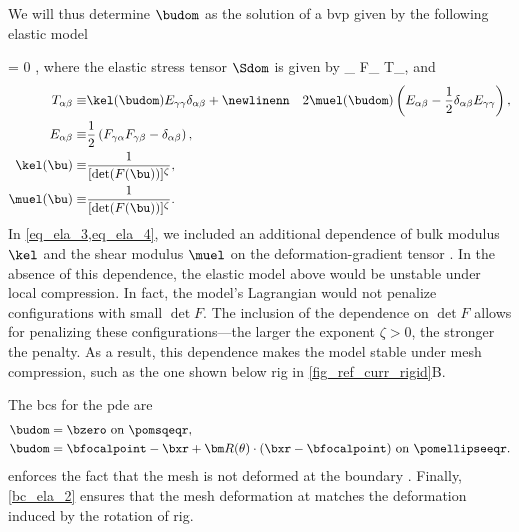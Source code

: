 We will thus determine $\budom$ as the solution of a \ac{bvp} given by the following elastic model \cite{kamenskyLectureNotesMAE,marsdenMathematicalFoundationsElasticity1994}

\be\label{eq_mesh_fluid_rigid}
\pder{\Sdom_{\alpha \beta}(\budom)}{\xr^\beta} = 0  \omr,
\ee
where the elastic stress tensor $\Sdom$ is given by
\be
\label{eq_def_S}
\Sdom_{\alpha \beta} \equiv F_{\alpha \gamma} T_{\gamma \beta},
\ee
and
\begin{align}
        \label{eq_ela_1}
        T_{\alpha \beta}  \equiv & \kel(\budom) E_{\gamma \gamma} \delta_{\alpha \beta} +\newlinenn
                                 & 2 \muel(\budom) \left(E_{\alpha \beta} - \frac{1}{2} \delta_{\alpha \beta} E_{\gamma \gamma}\right), \\
        \label{eq_ela_2}
        E_{\alpha \beta}  \equiv & \frac{1}{2}\left( F_{\gamma \alpha}F_{\gamma \beta} - \delta_{\alpha \beta}\right),                  \\
        \label{eq_ela_3}
        \kel(\bu)         \equiv & \frac{1}{[\det(F(\bu))]^\zeta},                                                                      \\
        \label{eq_ela_4}
        \muel(\bu)        \equiv & \frac{1}{[\det(F(\bu))]^\zeta}.
\end{align}
In \cref{eq_ela_3,eq_ela_4}, we included an additional dependence of bulk modulus $\kel$ and the shear modulus $\muel$ on the deformation-gradient tensor . In the absence of this dependence, the elastic model above would be unstable under local compression. In fact, the model's Lagrangian would not penalize configurations with  small $\det F$. The inclusion of the dependence  on $\det F$  allows for penalizing these configurations---the larger the exponent $\zeta > 0$, the stronger the penalty. As a result, this dependence makes the model stable under mesh compression, such as the one shown below \ac{rig} in \cref{fig_ref_curr_rigid}B.

The \acp{bc} for the  \ac{pde}  are
\begin{align}
        \label{bc_ela_1}
        \budom & =\bzero \text{ on } \pomsqeqr,                                                                 \\
        \label{bc_ela_2}
        \budom & = \bfocalpoint - \bxr + {\bm R}(\theta)\cdot (\bxr - \bfocalpoint) \text{ on } \pomellipseeqr.
\end{align}
 enforces the fact that the mesh is not deformed at the boundary \pomsqr. Finally,  \cref{bc_ela_2} ensures that the mesh deformation at \pomellipser  matches the deformation induced by the rotation of \ac{rig}.

